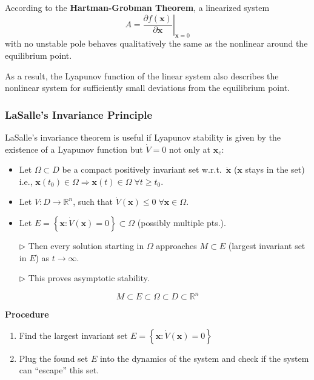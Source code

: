 According to the \textbf{Hartman-Grobman Theorem}, a linearized system
\noindent\begin{equation*}
    A = \left.\frac{\partial f(\mathbf{x})}{\partial \mathbf{x}} \right|_{\mathbf{x} = 0}
\end{equation*} with no unstable pole behaves qualitatively the same as the nonlinear around the equilibrium point.

\newpar{}
As a result, the Lyapunov function of the linear system also describes the nonlinear system for sufficiently small deviations from the equilibrium point.

\subsubsection{LaSalle's Invariance Principle}
LaSalle's invariance theorem is useful if Lyapunov stability is given by the existence of a Lyapunov function but $\dot{V}=0$ not only at $\mathbf{x}_e$:

\newpar{}
\begin{itemize}[leftmargin=14pt]
    \item Let $\Omega\subset D$ be a compact positively invariant set w.r.t.\ $\dot{\mathbf{x}}$ ($\mathbf{x}$ stays in the set) i.e., $\mathbf{x}(t_0)\in \Omega \Rightarrow \mathbf{x}(t)\in\Omega\; \forall t \geq t_0$.
    \item Let $V:D\to \mathbb{R}^n$, such that $\dot{V}(\mathbf{x})\leq 0\; \forall \mathbf{x}\in \Omega$.
    \item Let $E=\left\{\mathbf{x}: \dot{V}(\mathbf{x})=0\right\}\subset \Omega$ (possibly multiple pts.).
    \item[$\rhd$] Then every solution starting in $\Omega$ approaches $M\subset E$ (largest invariant set in $E$) as $t\to \infty$.
    \item[$\rhd$] This proves asymptotic stability.
\end{itemize}
\newpar{}
\begin{equation*}
    M\subset E \subset \Omega \subset D \subset \mathbb{R}^n
\end{equation*}

\newpar{}
\textbf{Procedure}
\begin{enumerate}
    \item Find the largest invariant set $E=\left\{\mathbf{x}: \dot{V}(\mathbf{x})=0\right\}$
    \item Plug the found set $E$ into the dynamics of the system and check if the system can ``escape'' this set.
\end{enumerate}

